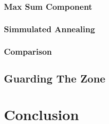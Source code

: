 \documentclass[11pt]{article}
\begin{document}
\subsubsection{Max Sum Component}
\subsubsection{Simmulated Annealing}
\subsubsection{Comparison}

\subsection{Guarding The Zone}

\section{Conclusion}
\end{document}
